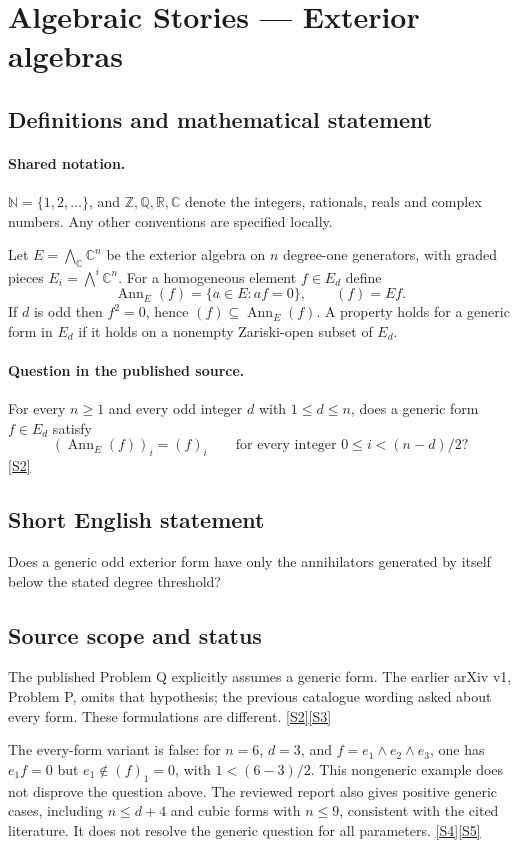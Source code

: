 \documentclass[11pt]{article}
\newcommand{\sref}[2]{\hyperlink{source:#1:#2}{[S#2]}}
\begin{document}
\section{Algebraic Stories — Exterior algebras}\label{statement}

\subsection{Definitions and mathematical statement}

\paragraph{Shared notation.}$\mathbb N=\{1,2,\ldots\}$, and $\mathbb Z,\mathbb Q,\mathbb R,\mathbb C$ denote the integers, rationals, reals and complex numbers. Any other conventions are specified locally.


Let $E=\bigwedge_{\mathbb C}\mathbb C^n$ be the exterior algebra on $n$ degree-one generators, with graded pieces $E_i=\bigwedge^i\mathbb C^n$. For a homogeneous element $f\in E_d$ define
\[\operatorname{Ann}_E(f)=\{a\in E:af=0\},\qquad (f)=Ef.
\]
If $d$ is odd then $f^2=0$, hence $(f)\subseteq\operatorname{Ann}_E(f)$.
A property holds for a generic form in $E_d$ if it holds on a nonempty Zariski-open subset of $E_d$.
\paragraph{Question in the published source.}
For every $n\geq1$ and every odd integer $d$ with $1\leq d\leq n$, does a generic form $f\in E_d$ satisfy
\[(\operatorname{Ann}_E(f))_i=(f)_i\qquad\text{for every integer }0\leq i<(n-d)/2?\] \sref{statement}{2}
\subsection{Short English statement}
Does a generic odd exterior form have only the annihilators generated by itself below the stated degree threshold?
\subsection{Source scope and status}
The published Problem Q explicitly assumes a generic form. The earlier arXiv v1, Problem P, omits that hypothesis; the previous catalogue wording asked about every form. These formulations are different. \sref{statement}{2}\sref{statement}{3}

The every-form variant is false: for $n=6$, $d=3$, and $f=e_1\wedge e_2\wedge e_3$, one has $e_1f=0$ but $e_1\notin(f)_1=0$, with $1<(6-3)/2$. This nongeneric example does not disprove the question above. The reviewed report also gives positive generic cases, including $n\leq d+4$ and cubic forms with $n\leq9$, consistent with the cited literature. It does not resolve the generic question for all parameters. \sref{statement}{4}\sref{statement}{5}
\end{document}
